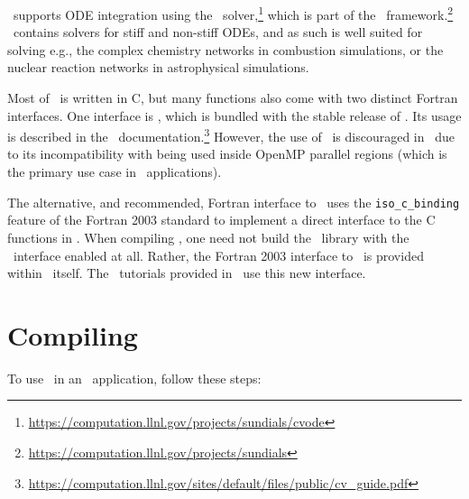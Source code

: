 \amrex\ supports ODE integration using the \cvode\ solver,\footnote{\url{https://computation.llnl.gov/projects/sundials/cvode}} which is part of the \sundials\ framework.\footnote{\url{https://computation.llnl.gov/projects/sundials}}
\cvode\ contains solvers for stiff and non-stiff ODEs, and as such is well suited for solving e.g., the complex chemistry networks in combustion simulations, or the nuclear reaction networks in astrophysical simulations.

Most of \cvode\ is written in C, but many functions also come with two distinct Fortran interfaces.
One interface is \fcvode, which is bundled with the stable release of \cvode.
Its usage is described in the \cvode\ documentation.\footnote{\url{https://computation.llnl.gov/sites/default/files/public/cv_guide.pdf}}
However, the use of \fcvode\ is discouraged in \amrex\ due to its incompatibility with being used inside OpenMP parallel regions (which is the primary use case in \amrex\ applications).

The alternative, and recommended, Fortran interface to \cvode\ uses the \texttt{iso\_c\_binding} feature of the Fortran 2003 standard to implement a direct interface to the C functions in \cvode.
When compiling \cvode, one need not build the \cvode\ library with the \fcvode\ interface enabled at all.
Rather, the Fortran 2003 interface to \cvode\ is provided within \amrex\ itself.
The \cvode\ tutorials provided in \amrex\ use this new interface.

\section{Compiling \cvode}

To use \cvode\ in an \amrex\ application, follow these steps:

